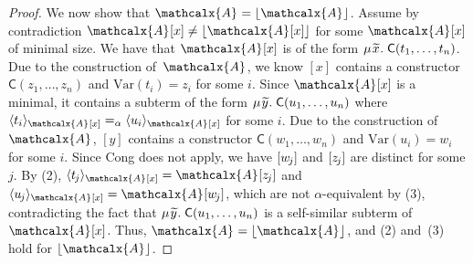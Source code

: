 \documentclass[smallcondensed,draft]{svjour3}
\newcommand\MU{\vvthinspace\mu\vvthinspace}
\newcommand\const[1]{\textsf{#1}}
\newcommand{\Ec}{E}
\newcommand{\rn}[1]{\textsf{#1}}
\newcommand{\expand}[2]{\langle \smash{#2} \rangle_{#1}}
\newcommand{\ec}[1]{[#1]}
\newcommand{\Val}{\mathcalx{A}\vvthinspace}
\newcommand{\Varec}[1]{\vvthinspace\widetilde{#1}\vvthinspace}
\newcommand{\nf}[1]{\lfloor#1\rfloor}
\newcommand{\aequiv}{\mathrel{=_\alpha}}
\newcommand{\muvar}{\mathrm{Var}} %
\newcommand\vvthinspace{\kern+0.041667em}
\newcommand\negvthinspace{\kern-0.083333em}
\begin{document}
\begin{proof}
We now show that $\Val = \nf{\Val}$.
Assume by contradiction $\Val \ec{x} \neq \nf{\Val \ec{x}}$ for some $\Val \ec{x}$ of minimal size.
We have that $\Val \ec{x}$ is of the form $\MU {\Varec{x}}.\; \const{C}( t_1, \ldots, t_n )$.
Due to the construction of~$\Val$,
we know $\ec{x}$ contains a constructor $\const{C}( z_1, \ldots, z_n )$ and $\muvar( t_i ) = z_i$ for some $i$. %
Since $\Val \ec{x}$ is a minimal, it
contains a subterm of the form $\MU {\Varec{y}}.\; \const{C}( u_1, \ldots, u_n )$
where $\expand{\Val \ec{x}}{ t_i } \aequiv \expand{\Val \ec{x} }{ u_i }$ for some $i$. %
Due to the construction of $\Val$, $\ec{y}$ contains a constructor $\const{C}( w_1, \ldots, w_n )$ and $\muvar( u_i ) = w_i$ for some $i$. %
Since \rn{Cong} does not apply, %
we have $\ec{w_{\negvthinspace j}}$ and $\ec{z_{\negvthinspace j}}$ are distinct for some $j$.
By (2), $\expand{\Val \ec{x}}{ t_{\negvthinspace j} } = \Val \ec{z_{\negvthinspace j}}$
and $\expand{\Val \ec{x}}{ u_{\negvthinspace j} } = \Val \ec{w_{\negvthinspace j}}$,
which are not $\alpha$-equivalent by (3), contradicting the fact that $\MU {\Varec{y}}.\; \const{C}( u_1, \ldots, u_n )$ is a self-similar subterm of $\Val \ec{x}$.
Thus, $\Val = \nf{\Val}$, and (2) and~(3) hold for $\nf{\Val}$.


\end{proof}
\end{document}
